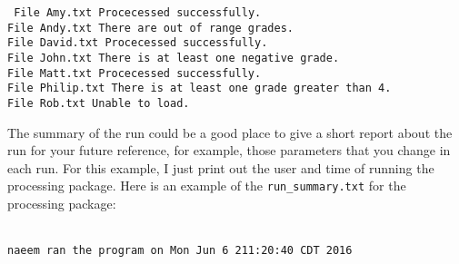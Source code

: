 \begin{mdframed}[hidealllines=true,backgroundcolor=gray!20]
\begin{singlespace}
\fontsize{10pt}{1pt}
\texttt{
\noindent
File  Amy.txt Procecessed successfully.\\
File  Andy.txt There are out of range grades.\\
File  David.txt Procecessed successfully.\\
File  John.txt There is at least one negative grade.\\
File  Matt.txt Procecessed successfully.\\
File  Philip.txt There is at least one grade greater than 4.\\
File  Rob.txt Unable to load.
}
\end{singlespace}
\end{mdframed}
\noindent
The summary of the run could be a good place to give a short report about the run for your future reference, for example, those parameters that you change in each run.
For this example, I just print out the user and time of running the processing package. Here is an example of the \texttt{run\_summary.txt} for the processing package:

\begin{mdframed}[hidealllines=true,backgroundcolor=gray!20]
\fontsize{10pt}{1pt}
\texttt{
\\
naeem ran the program on Mon Jun 6 211:20:40 CDT 2016
\\
}
\end{mdframed}


